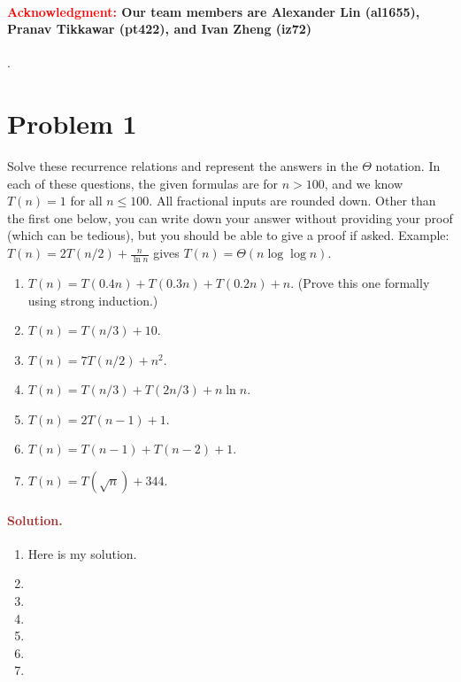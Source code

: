 \paragraph{\textcolor{red}{Acknowledgment:} Our team members are \textbf{Alexander Lin (al1655)}, \textbf{Pranav Tikkawar (pt422)}, and \textbf{Ivan Zheng (iz72)}}.

\section*{Problem 1}
Solve these recurrence relations and represent the answers in the $\Theta$ notation. In each of these questions, the given formulas are for $n > 100$, and we know $T(n) = 1$ for all $n \leq 100$. All fractional inputs are rounded down. Other than the first one below, you can write down your answer without providing your proof (which can be tedious), but you should be able to give a proof if asked. Example: $T(n) = 2T(n/2) + \frac{n}{\ln n}$ gives $T(n) = \Theta(n \log \log n)$.
\begin{enumerate}
    \item $T(n) = T(0.4n) + T(0.3n) + T(0.2n) + n$. (Prove this one formally using strong induction.)
    \item $T(n) = T(n/3) + 10$.
    \item $T(n) = 7 T(n/2) + n^2$.
    \item $T(n) = T(n/3) + T(2n/3) + n \ln n$.
    \item $T(n) = 2T(n - 1) + 1$.
    \item $T(n) = T(n - 1) + T(n - 2) + 1$.
    \item $T(n) = T(\sqrt{n}) + 344$.
\end{enumerate}

\paragraph{\textcolor{brown}{Solution.}}
\begin{enumerate}
    \item Here is my solution.
    \item 
    \item 
    \item 
    \item
    \item 
    \item 
\end{enumerate}

